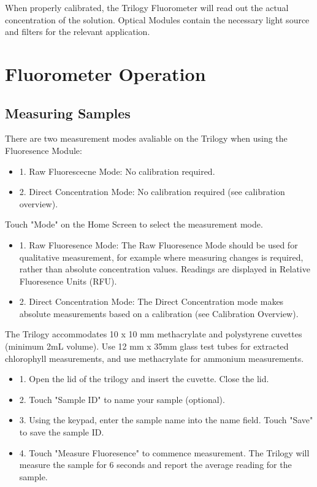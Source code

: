 \documentclass[12pt]{../SOP3_beta}\usepackage[]{graphicx}\usepackage[]{color}
\begin{document}
\NP When properly calibrated, the Trilogy Fluorometer will read out the actual concentration of the solution. Optical Modules contain the necessary light source and filters for the relevant application. 

\section{Fluorometer Operation}
\subsection{Measuring Samples}
\NP There are two measurement modes avaliable on the Trilogy when using the Fluoresence Module:
\begin{itemize}
  \item 1. Raw Fluorescecne Mode: No calibration required.
  \item 2. Direct Concentration Mode: No calibration required (see calibration overview).
\end{itemize}
\NP Touch "Mode" on the Home Screen to select the measurement mode.
\begin{itemize}
  \item 1. Raw Fluoresence Mode: The Raw Fluoresence Mode should be used for qualitative measurement, for example where measuring changes is required, rather than absolute concentration values. Readings are displayed in Relative Fluoresence Units (RFU).
  \item 2. Direct Concentration Mode: The Direct Concentration mode makes absolute measurements based on a calibration (see Calibration Overview).
\end{itemize}

\NP The Trilogy accommodates 10 x 10 mm methacrylate and polystyrene cuvettes (minimum 2mL volume). Use 12 mm x 35mm glass test tubes for extracted chlorophyll measurements, and use methacrylate for ammonium measurements.
\begin{itemize}
  \item 1. Open the lid of the trilogy and insert the cuvette. Close the lid.
  \item 2. Touch "Sample ID" to name your sample (optional).
  \item 3. Using the keypad, enter the sample name into the name field. Touch "Save" to save the sample ID.
  \item 4. Touch "Measure Fluoresence" to commence measurement. The Trilogy will measure the sample for 6 seconds and report the average reading for the sample. 
\end{itemize}
\end{document}
